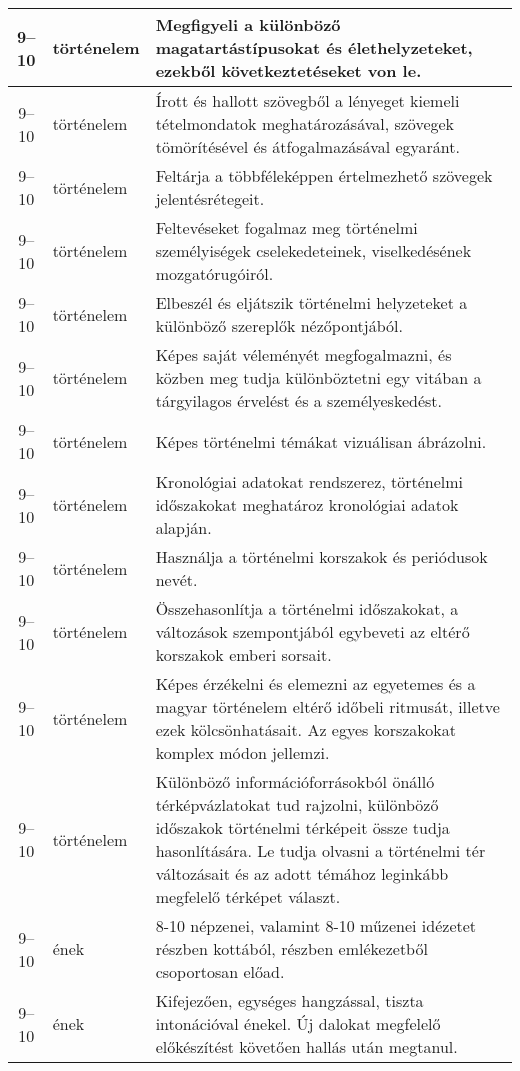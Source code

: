 \begin{small}
\begin{longtable}{c | p{2cm} |  p{11cm} }
              9--10 & történelem & Megfigyeli a különböző magatartástípusokat és élethelyzeteket, ezekből következtetéseket von le. \\ \hline
              9--10 & történelem & Írott és hallott szövegből a lényeget kiemeli tételmondatok meghatározásával, szövegek tömörítésével és átfogalmazásával egyaránt. \\ \hline
              9--10 & történelem & Feltárja a többféleképpen értelmezhető szövegek jelentésrétegeit. \\ \hline
              9--10 & történelem & Feltevéseket fogalmaz meg történelmi személyiségek cselekedeteinek, viselkedésének mozgatórugóiról. \\ \hline
              9--10 & történelem & Elbeszél és eljátszik történelmi helyzeteket a különböző szereplők nézőpontjából. \\ \hline
              9--10 & történelem & Képes saját véleményét megfogalmazni, és közben meg tudja különböztetni egy vitában a tárgyilagos érvelést és a személyeskedést. \\ \hline
              9--10 & történelem & Képes történelmi témákat vizuálisan ábrázolni. \\ \hline
              9--10 & történelem & Kronológiai adatokat rendszerez, történelmi időszakokat meghatároz kronológiai adatok alapján. \\ \hline
              9--10 & történelem & Használja a történelmi korszakok és periódusok nevét. \\ \hline
              9--10 & történelem & Összehasonlítja a történelmi időszakokat, a változások szempontjából egybeveti az eltérő korszakok emberi sorsait. \\ \hline
              9--10 & történelem & Képes érzékelni és elemezni az egyetemes és a magyar történelem eltérő időbeli ritmusát, illetve ezek kölcsönhatásait. Az egyes korszakokat komplex módon jellemzi. \\ \hline
              9--10 & történelem & Különböző információforrásokból önálló térképvázlatokat tud rajzolni, különböző időszakok történelmi térképeit össze tudja hasonlítására. Le tudja olvasni a történelmi tér változásait és az adott témához leginkább megfelelő térképet választ. \\ \hline
              9--10 & ének & 8-10 népzenei, valamint 8-10 műzenei idézetet részben kottából, részben emlékezetből csoportosan előad. \\ \hline
              9--10 & ének & Kifejezően, egységes hangzással, tiszta intonációval énekel. Új dalokat megfelelő előkészítést követően hallás után megtanul. \\ \hline

\end{longtable}
\end{small}
